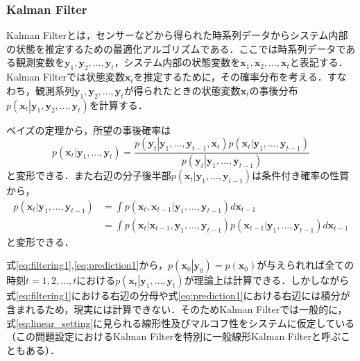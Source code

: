         \subsubsection{Kalman Filter}
        Kalman Filterとは，センサーなどから得られた時系列データからシステム内部の状態を推定するための最適化アルゴリズムである．ここでは時系列データである観測変数を$\bm{y}_1, \bm{y}_2, \dots, \bm{y}_t$，システム内部の状態変数を$\bm{x}_1, \bm{x}_2, \dots, \bm{x}_t$と表記する．Kalman Filterでは状態変数$\bm{x}_t$を推定するために，その確率分布を考える．すなわち，観測系列$\bm{y}_1, \bm{y}_2, \dots, \bm{y}_t$が得られたときの状態変数$\bm{x}_t$の事後分布$p(\bm{x}_t \left| \bm{y}_1, \bm{y}_2, \dots, \bm{y}_t \right.)$を計算する．
        \par
        ベイズの定理から，所望の事後確率は
        \begin{equation}
            \label{eq:filtering1}
            p(\left. \bm{x}_t \right| \bm{y}_1,..., \bm{y}_t ) = \frac{p(\left. \bm{y}_t \right| \bm{y}_1,..., \bm{y}_{t-1}, \bm{x}_t) p(\left.\bm{x}_t\right| \bm{y}_1,..., \bm{y}_{t-1})}{p(\left.\bm{y}_t\right| \bm{y}_1,..., \bm{y}_{t-1})}
        \end{equation}
        と変形できる．また右辺の分子後半部$p(\left.\bm{x}_t\right| \bm{y}_1,..., \bm{y}_{t-1})$は条件付き確率の性質から，
        \begin{equation}
            \label{eq:prediction1}
            \begin{aligned}
                p(\left.\bm{x}_t\right| \bm{y}_1,..., \bm{y}_{t-1}) &= \int p(\left.\bm{x}_t, \bm{x}_{t-1}\right| \bm{y}_1,..., \bm{y}_{t-1}) d\bm{x}_{t-1}
                \\ &= \int p(\left.\bm{x}_t\right|\bm{x}_{t-1}, \bm{y}_1,..., \bm{y}_{t-1}) p(\left.\bm{x}_{t-1}\right| \bm{y}_1,..., \bm{y}_{t-1}) d\bm{x}_{t-1}
            \end{aligned}        
        \end{equation}
        と変形できる．
        \par
        式\ref{eq:filtering1},\ref{eq:prediction1}から，$p(\bm{x}_0\left|\bm{y}_0\right.) = p(\bm{x}_0)$が与えられれば全ての時刻$t=1,2,\dots,t$における$p(\bm{x}_t\left|\bm{y}_1,\dots,\bm{y}_t\right.)$が理論上は計算できる．しかしながら式\ref{eq:filtering1}における右辺の分母や式\ref{eq:prediction1}における右辺には積分が含まれるため，現実には計算できない．そのためKalman Filterでは一般的に，式\ref{eq:linear_setting}に見られる線形性及びマルコフ性をシステムに仮定している（この問題設定におけるKalman Filterを特別に一般線形Kalman Filterと呼ぶこともある）．
